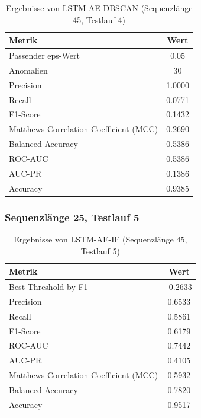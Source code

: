 \documentclass[a4paper,12pt]{article}
\begin{document}
\begin{table}[H]
	\centering
	\caption{Ergebnisse von LSTM-AE-DBSCAN (Sequenzlänge 45, Testlauf 4)}
	\begin{tabular}{lc}
		\hline
		Metrik & Wert \\
		\hline
		Passender eps-Wert & 0.05 \\
		Anomalien & 30 \\
		Precision & 1.0000 \\
		Recall & 0.0771 \\
		F1-Score & 0.1432 \\
		Matthews Correlation Coefficient (MCC) & 0.2690 \\
		Balanced Accuracy & 0.5386 \\
		ROC-AUC & 0.5386 \\
		AUC-PR & 0.1386 \\
		Accuracy & 0.9385 \\
		\hline
	\end{tabular}
\end{table}

\subsubsection{Sequenzlänge 25, Testlauf 5}

\begin{table}[H]
	\centering
	\caption{Ergebnisse von LSTM-AE-IF (Sequenzlänge 45, Testlauf 5)}
	\begin{tabular}{lc}
		\hline
		Metrik & Wert \\
		\hline
		Best Threshold by F1 & -0.2633 \\
		Precision & 0.6533 \\
		Recall & 0.5861 \\
		F1-Score & 0.6179 \\
		ROC-AUC & 0.7442 \\
		AUC-PR & 0.4105 \\
		Matthews Correlation Coefficient (MCC) & 0.5932 \\
		Balanced Accuracy & 0.7820 \\
		Accuracy & 0.9517 \\
		\hline
	\end{tabular}
\end{table}
\end{document}
